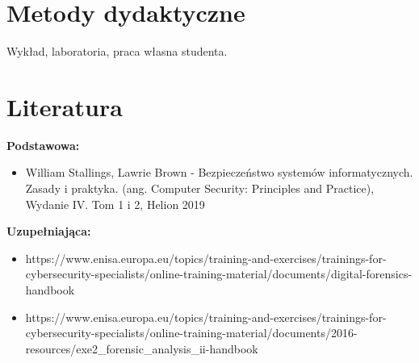 \documentclass[12pt, a4paper]{article}
\begin{document}
\section{Metody dydaktyczne}

Wykład, laboratoria, praca własna studenta.

\section{Literatura}

\textbf{Podstawowa:}
\begin{itemize}
  \item William Stallings, Lawrie Brown - Bezpieczeństwo systemów informatycznych. Zasady i praktyka. (ang. Computer Security: Principles and Practice), Wydanie IV. Tom 1 i 2, Helion 2019
\end{itemize}

\textbf{Uzupełniająca:}
\begin{itemize}
  \item https://www.enisa.europa.eu/topics/training-and-exercises/trainings-for-cybersecurity-specialists/online-training-material/documents/digital-forensics-handbook
  \item https://www.enisa.europa.eu/topics/training-and-exercises/trainings-for-cybersecurity-specialists/online-training-material/documents/2016-resources/exe2\_forensic\_analysis\_ii-handbook
\end{itemize}
\end{document}

